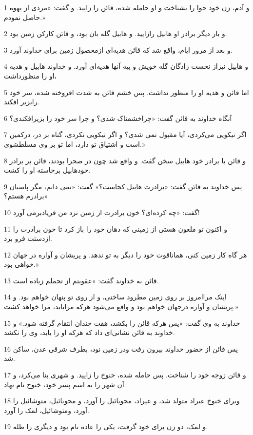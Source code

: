 \par 1 و آدم، زن خود حوا را بشناخت و او حامله شده، قائن را زایید. و گفت: «مردی از یهوه حاصل نمودم.»
\par 2 و بار دیگر برادر او هابیل رازایید. و هابیل گله بان بود، و قائن کارکن زمین بود.
\par 3 و بعد از مرور ایام، واقع شد که قائن هدیه‌ای ازمحصول زمین برای خداوند آورد.
\par 4 و هابیل نیزاز نخست زادگان گله خویش و پیه آنها هدیه‌ای آورد. و خداوند هابیل و هدیه او را منظورداشت،
\par 5 اما قائن و هدیه او را منظور نداشت. پس خشم قائن به شدت افروخته شده، سر خود رابزیر افکند.
\par 6 آنگاه خداوند به قائن گفت: «چراخشمناک شدی؟ و چرا سر خود را بزیرافکندی؟
\par 7 اگر نیکویی می‌کردی، آیا مقبول نمی شدی؟ و اگر نیکویی نکردی، گناه بر در، درکمین است و اشتیاق تو دارد، اما تو بر وی مسلطشوی.»
\par 8 و قائن با برادر خود هابیل سخن گفت. و واقع شد چون در صحرا بودند، قائن بر برادر خودهابیل برخاسته او را کشت.
\par 9 پس خداوند به قائن گفت: «برادرت هابیل کجاست؟» گفت: «نمی دانم، مگر پاسبان برادرم هستم؟»
\par 10 گفت: «چه کرده‌ای؟ خون برادرت از زمین نزد من فریادبرمی آورد!
\par 11 و اکنون تو ملعون هستی از زمینی که دهان خود را باز کرد تا خون برادرت را ازدستت فرو برد.
\par 12 هر گاه کار زمین کنی، هماناقوت خود را دیگر به تو ندهد. و پریشان و آواره در جهان خواهی بود.»
\par 13 قائن به خداوند گفت: «عقوبتم از تحملم زیاده است.
\par 14 اینک مراامروز بر روی زمین مطرود ساختی، و از روی تو پنهان خواهم بود. و پریشان و آواره درجهان خواهم بود و واقع می‌شود هر‌که مرایابد، مرا خواهد کشت.»
\par 15 خداوند به وی گفت: «پس هر‌که قائن را بکشد، هفت چندان انتقام گرفته شود.» و خداوند به قائن نشانی‌ای داد که هر‌که او را یابد، وی را نکشد.
\par 16 پس قائن از حضور خداوند بیرون رفت ودر زمین نود، بطرف شرقی عدن، ساکن شد. 
\par 17 و قائن زوجه خود را شناخت. پس حامله شده، خنوخ را زایید. و شهری بنا می‌کرد، و آن شهر را به اسم پسر خود، خنوخ نام نهاد.
\par 18 وبرای خنوخ عیراد متولد شد، و عیراد، محویائیل را آورد، و محویائیل، متوشائیل را آورد، ومتوشائیل، لمک را آورد.
\par 19 و لمک، دو زن برای خود گرفت، یکی را عاده نام بود و دیگری را ظله.

